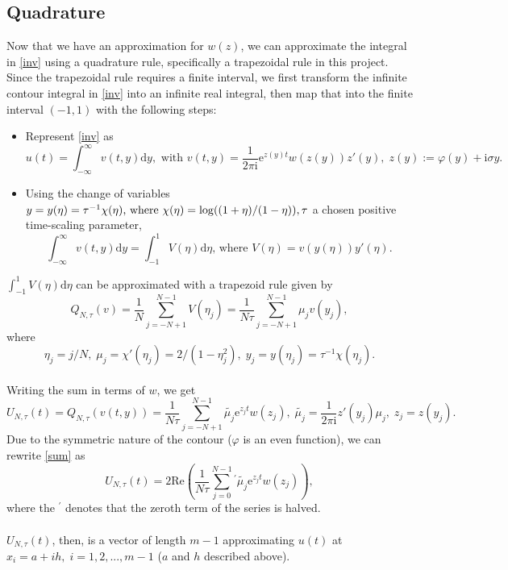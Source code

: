 \documentclass[letterpaper, 12pt]{article}
\def\e{\text{e}}
\def\i{\text{i}}
\def\d{\text{d}}
\begin{document}
		\subsection*{Quadrature}
		Now that we have an approximation for $w(z)$, we can approximate the integral in \eqref{inv} using a quadrature rule, specifically a trapezoidal rule in this project. Since the trapezoidal rule requires a finite interval, we first transform the infinite contour integral in \eqref{inv} into an infinite real integral, then map that into the finite interval $(-1,1)$ with the following steps:
		\begin{itemize}
		\renewcommand{\labelitemi}{--}
			\item Represent \eqref{inv} as
			$$u(t)=\int_{-\infty}^\infty v(t,y)\d y,\text{ with }v(t,y)=\frac{1}{2\pi\i}\e^{z(y)t}w(z(y))z'(y),\;z(y):=\varphi(y)+\i\sigma y.$$
			\item Using the change of variables $y=y(\eta)=\tau^{-1}\chi(\eta)\text{, where }\chi(\eta)=\log((1+\eta)/(1-\eta)),\\\tau$ a chosen positive time-scaling parameter, 
			$$\int_{-\infty}^\infty v(t,y)\d y=\int_{-1}^1V(\eta)\d\eta\text{, where }V(\eta)=v(y(\eta))y'(\eta).$$  
		\end{itemize}
		$\displaystyle \int_{-1}^1V(\eta)\d\eta$ can be approximated with a trapezoid rule given by
		$$Q_{N,\tau}(v)=\frac{1}{N}\sum_{j=-N+1}^{N-1}V(\eta_j)=\frac{1}{N\tau}\sum_{j=-N+1}^{N-1}\mu_jv(y_j),$$
		where
		$$\eta_j=j/N,\;\mu_j=\chi'(\eta_j)=2/(1-\eta_j^2),\;y_j=y(\eta_j)=\tau^{-1}\chi(\eta_j).$$\\
		Writing the sum in terms of $w$, we get
		\begin{equation}\label{sum}
			U_{N,\tau}(t)=Q_{N,\tau}(v(t,y))=\frac{1}{N\tau}\sum_{j=-N+1}^{N-1}\tilde{\mu_j}\e^{z_jt}w(z_j),\;\tilde{\mu_j}=\frac{1}{2\pi\i}z'(y_j)\mu_j,\;z_j=z(y_j).
		\end{equation}
		Due to the symmetric nature of the contour ($\varphi$ is an even function), we can rewrite \eqref{sum} as
		$$U_{N,\tau}(t)=2\text{Re}\left(\frac{1}{N\tau}\sum_{j=0}^{N-1}{}^\prime \tilde{\mu_j}\e^{z_jt}w(z_j)\right),$$
		where the ${}^\prime$ denotes that the zeroth term of the series is halved. \\\\
		$U_{N,\tau}(t)$, then, is a vector of length $m-1$ approximating $u(t)$ at $x_i=a+ih,\;i=1,2,...,m-1$ ($a$ and $h$ described above).
		
\end{document}
